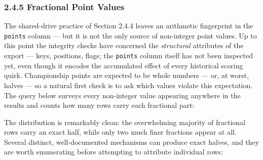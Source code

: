 \documentclass[
]{article}
\begin{document}
\newpage

\subsubsection{2.4.5 Fractional Point
Values}\label{fractional-point-values}

The shared-drive practice of Section 2.4.4 leaves an arithmetic
fingerprint in the \texttt{points} column --- but it is not the only
source of non-integer point values. Up to this point the integrity
checks have concerned the \emph{structural} attributes of the export ---
keys, positions, flags; the \texttt{points} column itself has not been
inspected yet, even though it encodes the accumulated effect of every
historical scoring quirk. Championship points are expected to be whole
numbers --- or, at worst, halves --- so a natural first check is to ask
which values violate this expectation. The query below surveys every
non-integer value appearing anywhere in the results and counts how many
rows carry each fractional part:

\begin{table}[!h]
\centering\begingroup\fontsize{8}{10}\selectfont

\endgroup{}
\end{table}

The distribution is remarkably clean: the overwhelming majority of
fractional rows carry an exact half, while only two much finer fractions
appear at all. Several distinct, well-documented mechanisms can produce
exact halves, and they are worth enumerating before attempting to
attribute individual rows:
\end{document}
